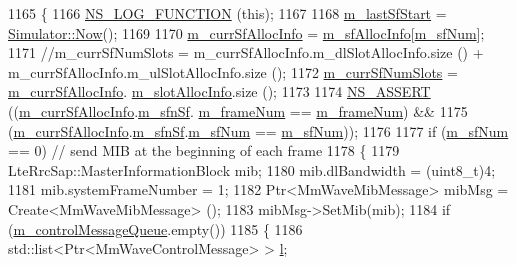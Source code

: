 \begin{DoxyCode}
1165 \{
1166         \hyperlink{log-macros-disabled_8h_a90b90d5bad1f39cb1b64923ea94c0761}{NS\_LOG\_FUNCTION} (\textcolor{keyword}{this});
1167 
1168         \hyperlink{classns3_1_1MmWaveEnbPhy_aa928d54402d87640ee61f0c3b5cf2e0c}{m\_lastSfStart} = \hyperlink{classns3_1_1Simulator_ac3178fa975b419f7875e7105be122800}{Simulator::Now}();
1169 
1170         \hyperlink{classns3_1_1MmWavePhy_adf1e91c9da8a1d3f82b1517363cddbe8}{m\_currSfAllocInfo} = \hyperlink{classns3_1_1MmWavePhy_a6e7002b99b8c50976033e0b96523f08c}{m\_sfAllocInfo}[\hyperlink{classns3_1_1MmWavePhy_af3d76eb9f3e5e1ff669852d05986c1a3}{m\_sfNum}];
1171         \textcolor{comment}{//m\_currSfNumSlots = m\_currSfAllocInfo.m\_dlSlotAllocInfo.size () +
       m\_currSfAllocInfo.m\_ulSlotAllocInfo.size ();}
1172         \hyperlink{classns3_1_1MmWaveEnbPhy_a009230227393f4585df5440133f1a52b}{m\_currSfNumSlots} = \hyperlink{classns3_1_1MmWavePhy_adf1e91c9da8a1d3f82b1517363cddbe8}{m\_currSfAllocInfo}.
      \hyperlink{structns3_1_1SfAllocInfo_a6a87109ff89bf270a74ff95a5bbf9231}{m\_slotAllocInfo}.size ();
1173 
1174         \hyperlink{assert_8h_a6dccdb0de9b252f60088ce281c49d052}{NS\_ASSERT} ((\hyperlink{classns3_1_1MmWavePhy_adf1e91c9da8a1d3f82b1517363cddbe8}{m\_currSfAllocInfo}.\hyperlink{structns3_1_1SfAllocInfo_a94ce81441772a4663db2051e7fb3e7d7}{m\_sfnSf}.
      \hyperlink{structns3_1_1SfnSf_a28d741175c84feef9a47c8d8bd60b9bf}{m\_frameNum} == \hyperlink{classns3_1_1MmWavePhy_a852ce585035a1c12122d2775e64ff38a}{m\_frameNum}) &&
1175                    (\hyperlink{classns3_1_1MmWavePhy_adf1e91c9da8a1d3f82b1517363cddbe8}{m\_currSfAllocInfo}.\hyperlink{structns3_1_1SfAllocInfo_a94ce81441772a4663db2051e7fb3e7d7}{m\_sfnSf}.\hyperlink{structns3_1_1SfnSf_a501403661892f4c9bf1d40ef088f3f36}{m\_sfNum} == 
      \hyperlink{classns3_1_1MmWavePhy_af3d76eb9f3e5e1ff669852d05986c1a3}{m\_sfNum}));
1176 
1177         \textcolor{keywordflow}{if} (\hyperlink{classns3_1_1MmWavePhy_af3d76eb9f3e5e1ff669852d05986c1a3}{m\_sfNum} == 0)                \textcolor{comment}{// send MIB at the beginning of each frame}
1178         \{
1179                 LteRrcSap::MasterInformationBlock mib;
1180                 mib.dlBandwidth = (uint8\_t)4;
1181                 mib.systemFrameNumber = 1;
1182                 Ptr<MmWaveMibMessage> mibMsg = Create<MmWaveMibMessage> ();
1183                 mibMsg->SetMib(mib);
1184                 \textcolor{keywordflow}{if} (\hyperlink{classns3_1_1MmWavePhy_ab8d262ef427a0c22ebb614f9991e7ce0}{m\_controlMessageQueue}.empty())
1185                 \{
1186                         std::list<Ptr<MmWaveControlMessage> > \hyperlink{buildings__pathloss_8m_a5b54c0a045f179bcbbbc9abcb8b5cd4c}{l};

\end{DoxyCode}
